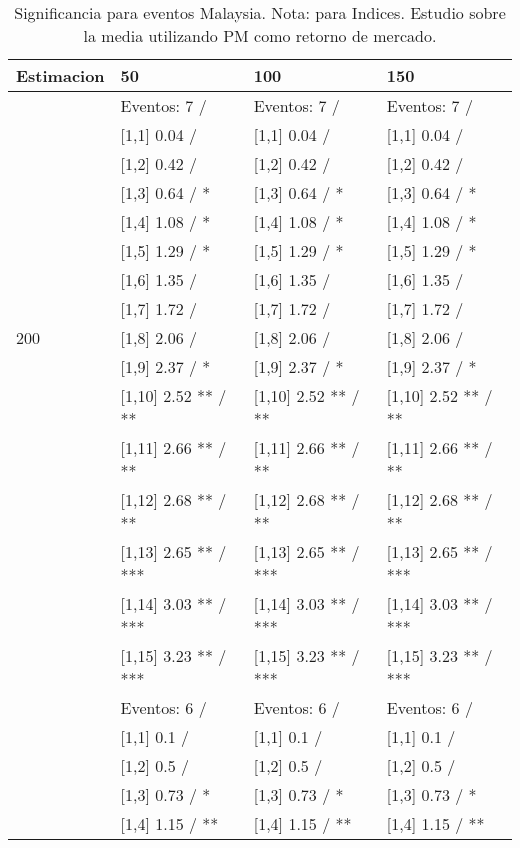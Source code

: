 \begin{table}

\caption{Significancia para eventos Malaysia. Nota: para Indices. Estudio sobre la media utilizando PM como retorno de mercado.}
\centering
\begin{tabular}[t]{llll}
\toprule
Estimacion & 50 & 100 & 150\\
\midrule
 & Eventos:  7 / & Eventos:  7 / & Eventos:  7 /\\
 & {}[1,1] 0.04  / & {}[1,1] 0.04  / & {}[1,1] 0.04  /\\
 & {}[1,2] 0.42  / & {}[1,2] 0.42  / & {}[1,2] 0.42  /\\
 & {}[1,3] 0.64  / * & {}[1,3] 0.64  / * & {}[1,3] 0.64  / *\\
 & {}[1,4] 1.08  / * & {}[1,4] 1.08  / * & {}[1,4] 1.08  / *\\
\addlinespace
 & {}[1,5] 1.29  / * & {}[1,5] 1.29  / * & {}[1,5] 1.29  / *\\
 & {}[1,6] 1.35  / & {}[1,6] 1.35  / & {}[1,6] 1.35  /\\
 & {}[1,7] 1.72  / & {}[1,7] 1.72  / & {}[1,7] 1.72  /\\
200 & {}[1,8] 2.06  / & {}[1,8] 2.06  / & {}[1,8] 2.06  /\\
 & {}[1,9] 2.37  / * & {}[1,9] 2.37  / * & {}[1,9] 2.37  / *\\
\addlinespace
 & {}[1,10] 2.52 ** / ** & {}[1,10] 2.52 ** / ** & {}[1,10] 2.52 ** / **\\
 & {}[1,11] 2.66 ** / ** & {}[1,11] 2.66 ** / ** & {}[1,11] 2.66 ** / **\\
 & {}[1,12] 2.68 ** / ** & {}[1,12] 2.68 ** / ** & {}[1,12] 2.68 ** / **\\
 & {}[1,13] 2.65 ** / *** & {}[1,13] 2.65 ** / *** & {}[1,13] 2.65 ** / ***\\
 & {}[1,14] 3.03 ** / *** & {}[1,14] 3.03 ** / *** & {}[1,14] 3.03 ** / ***\\
\addlinespace
 & {}[1,15] 3.23 ** / *** & {}[1,15] 3.23 ** / *** & {}[1,15] 3.23 ** / ***\\
 & Eventos:  6 / & Eventos:  6 / & Eventos:  6 /\\
 & {}[1,1] 0.1  / & {}[1,1] 0.1  / & {}[1,1] 0.1  /\\
 & {}[1,2] 0.5  / & {}[1,2] 0.5  / & {}[1,2] 0.5  /\\
 & {}[1,3] 0.73  / * & {}[1,3] 0.73  / * & {}[1,3] 0.73  / *\\
\addlinespace
 & {}[1,4] 1.15  / ** & {}[1,4] 1.15  / ** & {}[1,4] 1.15  / **\\

\end{tabular}
\end{table}
